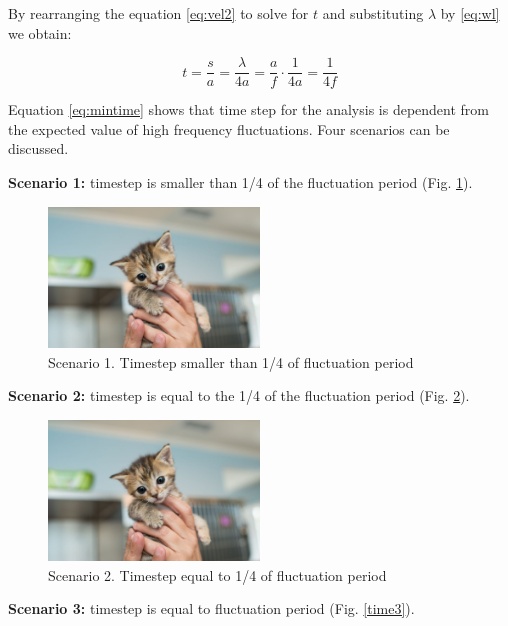 By rearranging the equation \ref{eq:vel2} to solve for $t$ and substituting $\lambda$ by \ref{eq:wl} we obtain:

\begin{equation} \label{eq:mintime}
t = \frac{s}{a} = \frac{\lambda}{4a} = \frac{a}{f} \cdot \frac{1}{4a} = \frac{1}{4f}
\end{equation}

Equation \ref{eq:mintime} shows that time step for the analysis is dependent from the expected value of high frequency fluctuations. Four scenarios can be discussed.

\textbf{Scenario 1:} timestep is smaller than 1/4 of the fluctuation period (Fig. \ref{time1}).

\begin{figure}[h!]
\centering %
\includegraphics[width=0.5\textwidth]{Pictures/kitten-placeholder.jpg}
\caption{Scenario 1. Timestep smaller than 1/4 of fluctuation period}
\label{time1}
\end{figure}

\textbf{Scenario 2:} timestep is equal to the  1/4 of the fluctuation period (Fig. \ref{time2}).

\begin{figure}[h!]
\centering %
\includegraphics[width=0.5\textwidth]{Pictures/kitten-placeholder.jpg}
\caption{Scenario 2. Timestep equal to 1/4 of fluctuation period}
\label{time2}
\end{figure}

\textbf{Scenario 3:} timestep is equal to fluctuation period (Fig. \ref{time3}).

